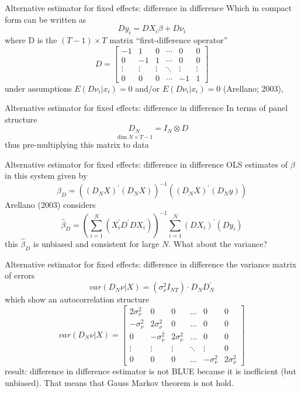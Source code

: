 \begin{frame}{Alternative estimator for fixed effects: difference in difference}
	Which in compact form can be written as
		$$Dy_{i}=DX_{i}\beta +D\nu _{i}$$
	where D is the $\left( T-1\right) \times T$ matrix ``first-difference operator''
		$$D=\left[ \begin{array}{cccccc}
						-1 & 1 & 0 & \cdots & 0 & 0 \\ 
						0 & -1 & 1 & \cdots & 0 & 0 \\ 
						\vdots & \vdots & \vdots & \ddots & \vdots & \vdots \\ 
						0 & 0 & 0 & \cdots & -1 & 1
					\end{array}
			\right]$$
	under assumptions $E\left( D\nu_{i}|x_{i}\right) = 0$ and/or $E\left( D\nu_{i}|x_{i}\right) =0$ (Arellano; 2003)$,$
\end{frame}
\begin{frame}{Alternative estimator for fixed effects: difference in difference}
	In terms of panel structure
		$$\underset{\dim N\times T-1}{D_{N}}=I_{N}\otimes D$$
	thus pre-multiplying this matrix to data
\end{frame}
\begin{frame}{Alternative estimator for fixed effects: difference in difference}
	OLS estimates of $\beta $ in this system given by
		$$\widehat{\beta}_{D}=\left(\left(D_{N}X\right)^{\prime}\left(D_{N}X\right) \right) ^{-1}\left(\left(D_{N}X\right)^{\prime}\left(D_{N}y\right) \right)$$
	Arellano (2003) considers
		$$\widehat{\beta}_{D}=\left(\sum_{i=1}^{N}\left(X_{i}^{\prime }D^{\prime}DX_{i}\right) \right)^{-1}\sum_{i=1}^{N}\left(DX_{i}\right)^{\prime}\left(Dy_{i}\right)$$
	this $\widehat{\beta}_{D}$ is unbiased and consistent for large $N$. What about the variance?
\end{frame}
\begin{frame}{Alternative estimator for fixed effects: difference in difference}
	the variance matrix of errors
		$$var\left(D_{N}\nu|X\right)=\left(\sigma_{\nu }^{2}I_{NT}\right) \cdot D_{N}D_{N}^{\prime}$$
	which show an autocorrelation structure%
		$$var\left( D_{N}\nu |X\right) =\left[ 
				\begin{array}{cccccc}
					2\sigma _{\nu }^{2} & 0 & 0 & \ldots & 0 & 0 \\ 
					-\sigma _{\nu }^{2} & 2\sigma _{\nu }^{2} & 0 & \ldots & 0 & 0 \\ 
					0 & -\sigma _{\nu }^{2} & 2\sigma _{\nu }^{2} & \ldots & 0 & 0 \\ 
					\vdots & \vdots & \vdots & \ddots & \vdots & 0 \\ 
					0 & 0 & 0 & \ldots & -\sigma _{\nu }^{2} & 2\sigma _{\nu }^{2}
				\end{array}
			  \right]$$
	result: difference in difference estimator is not BLUE because it is inefficient (but unbiased). That means that Gauss Markov theorem is not hold.
\end{frame}
